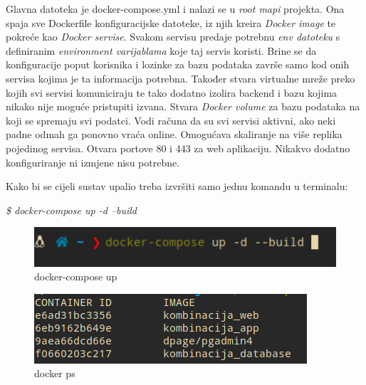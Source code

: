     			Glavna datoteka je docker-compose.yml i nalazi se u  \textit{root mapi} projekta. Ona spaja sve Dockerfile konfiguracijske datoteke, iz njih kreira  \textit{Docker image} te pokreće kao  \textit{Docker servise}. Svakom servisu predaje potrebnu  \textit{env datoteku} s definiranim  \textit{environment varijablama} koje taj servis koristi. Brine se da konfiguracije poput korisnika i lozinke za bazu podataka završe samo kod onih servisa kojima je ta informacija potrebna. Također stvara virtualne mreže preko kojih svi servisi komuniciraju te tako dodatno izolira backend i bazu kojima nikako nije moguće pristupiti izvana. Stvara  \textit{Docker volume} za bazu podataka na koji se spremaju svi podatci. Vodi računa da su svi servisi aktivni, ako neki padne odmah ga ponovno vraća online. Omogućava skaliranje na više replika pojedinog servisa. Otvara portove 80 i 443 za web aplikaciju. Nikakvo dodatno konfiguriranje ni izmjene nisu potrebne.
	
		Kako bi se cijeli sustav upalio treba izvršiti samo jednu komandu u terminalu:
		
		 \textit{\$ docker-compose up -d --build}
		
		\begin{figure}[H]
					\includegraphics[scale=0.5]{figures/terminl_1.PNG}
					\centering
					\caption{docker-compose up}
					\label{fig:sekv-uc13}
				\end{figure}
				
		\begin{figure}[H]
					\includegraphics[scale=1]{figures/2-ps.PNG}
					\centering
					\caption{docker ps}
					\label{fig:sekv-uc13}
				\end{figure}
						
